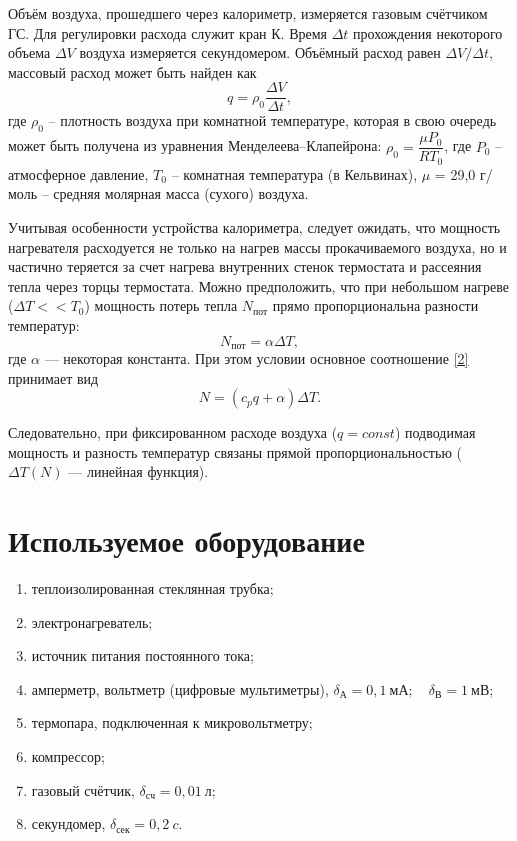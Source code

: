 \documentclass[a4paper, 12pt]{article}
\begin{document}
Объём воздуха, прошедшего через калориметр, измеряется газовым счётчиком ГС. Для регулировки расхода служит кран К. Время $\Delta t$ прохождения некоторого объема $\Delta V$ воздуха измеряется секундомером. Объёмный расход равен $\Delta V / \Delta t$, массовый расход может быть найден как
\begin{equation}\label{5}
q = \rho_0 \dfrac{\Delta V}{\Delta t},
\end{equation}
где $\rho_0$ -- плотность воздуха при комнатной температуре, которая в свою очередь может быть получена из уравнения Менделеева–Клапейрона: $\rho_0 = \dfrac{\mu P_0}{RT_0}$, где $P_0$ -- атмосферное давление, $T_0$ -- комнатная температура (в Кельвинах), $\mu$ = 29,0 г/моль -- средняя молярная масса (сухого) воздуха.

Учитывая особенности устройства калориметра, следует ожидать, что мощность нагревателя расходуется не только на нагрев массы прокачиваемого воздуха, но и частично теряется за счет нагрева внутренних стенок термостата и рассеяния тепла через торцы термостата. Можно предположить, что при небольшом нагреве ($\Delta T << T_0$) мощность потерь тепла $N_{\text{пот}}$ прямо пропорциональна разности температур:
\begin{equation}\label{6}
N_{\text{пот}} = \alpha \Delta T,
\end{equation}
где $\alpha$ — некоторая константа. При этом условии основное соотношение \eqref{2} принимает вид
\begin{equation}\label{7}
N = (c_p q + \alpha) \Delta T.
\end{equation}

Следовательно, при фиксированном расходе воздуха ($q = const$) подводимая мощность и разность температур связаны прямой пропорциональностью ($\Delta T (N)$ — линейная функция).

\section{Используемое оборудование}

\begin{enumerate}
    \item теплоизолированная стеклянная трубка;
    \item электронагреватель;
    \item источник питания постоянного тока;
    \item амперметр, вольтметр (цифровые мультиметры), $\delta_{А} = 0,1~мА;\quad \delta_{В} = 1~мВ$;
    \item термопара, подключенная к микровольтметру;
    \item компрессор;
    \item газовый счётчик, $\delta_{сч} = 0,01~л$;
    \item секундомер, $\delta_{сек} = 0,2~c$.
\end{enumerate}
\end{document}
